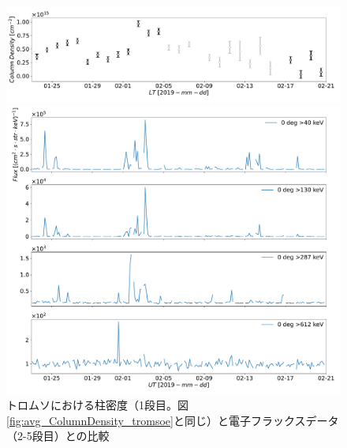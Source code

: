 \begin{figure}[htbp]
    \centering
    \begin{minipage}{\linewidth}
        \centering
        \includegraphics[width=\linewidth]{master_thesis_contents/master_thesis_fig/avg_ColumnDensity_tromsoe.pdf}
    \end{minipage}
    \begin{minipage}{\linewidth}
        \centering
        \includegraphics[width=\linewidth]{master_thesis_contents/master_thesis_fig/poes_tromsoe_0deg.pdf}
    \end{minipage}
    \caption{トロムソにおける柱密度（1段目。図\ref{fig:avg_ColumnDensity_tromsoe}と同じ）と電子フラックスデータ（2-5段目）との比較}
    \label{fig:ele_mmcd_tromsoe}
\end{figure}
